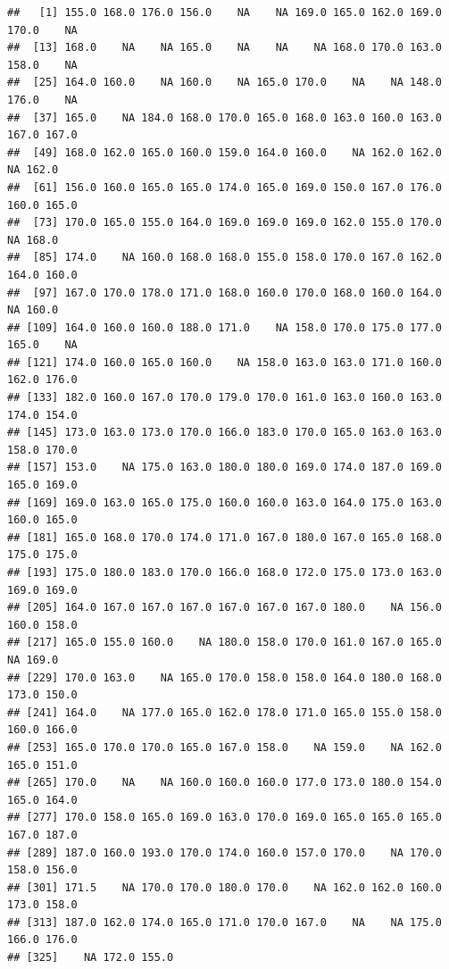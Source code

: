 \documentclass[
]{article}
\newenvironment{Shaded}{\begin{snugshade}}{\end{snugshade}}
\newcommand{\NormalTok}[1]{#1}
\newcommand{\SpecialCharTok}[1]{\textcolor[rgb]{0.00,0.00,0.00}{#1}}
\begin{document}
\begin{verbatim}
##   [1] 155.0 168.0 176.0 156.0    NA    NA 169.0 165.0 162.0 169.0 170.0    NA
##  [13] 168.0    NA    NA 165.0    NA    NA    NA 168.0 170.0 163.0 158.0    NA
##  [25] 164.0 160.0    NA 160.0    NA 165.0 170.0    NA    NA 148.0 176.0    NA
##  [37] 165.0    NA 184.0 168.0 170.0 165.0 168.0 163.0 160.0 163.0 167.0 167.0
##  [49] 168.0 162.0 165.0 160.0 159.0 164.0 160.0    NA 162.0 162.0    NA 162.0
##  [61] 156.0 160.0 165.0 165.0 174.0 165.0 169.0 150.0 167.0 176.0 160.0 165.0
##  [73] 170.0 165.0 155.0 164.0 169.0 169.0 169.0 162.0 155.0 170.0    NA 168.0
##  [85] 174.0    NA 160.0 168.0 168.0 155.0 158.0 170.0 167.0 162.0 164.0 160.0
##  [97] 167.0 170.0 178.0 171.0 168.0 160.0 170.0 168.0 160.0 164.0    NA 160.0
## [109] 164.0 160.0 160.0 188.0 171.0    NA 158.0 170.0 175.0 177.0 165.0    NA
## [121] 174.0 160.0 165.0 160.0    NA 158.0 163.0 163.0 171.0 160.0 162.0 176.0
## [133] 182.0 160.0 167.0 170.0 179.0 170.0 161.0 163.0 160.0 163.0 174.0 154.0
## [145] 173.0 163.0 173.0 170.0 166.0 183.0 170.0 165.0 163.0 163.0 158.0 170.0
## [157] 153.0    NA 175.0 163.0 180.0 180.0 169.0 174.0 187.0 169.0 165.0 169.0
## [169] 169.0 163.0 165.0 175.0 160.0 160.0 163.0 164.0 175.0 163.0 160.0 165.0
## [181] 165.0 168.0 170.0 174.0 171.0 167.0 180.0 167.0 165.0 168.0 175.0 175.0
## [193] 175.0 180.0 183.0 170.0 166.0 168.0 172.0 175.0 173.0 163.0 169.0 169.0
## [205] 164.0 167.0 167.0 167.0 167.0 167.0 167.0 180.0    NA 156.0 160.0 158.0
## [217] 165.0 155.0 160.0    NA 180.0 158.0 170.0 161.0 167.0 165.0    NA 169.0
## [229] 170.0 163.0    NA 165.0 170.0 158.0 158.0 164.0 180.0 168.0 173.0 150.0
## [241] 164.0    NA 177.0 165.0 162.0 178.0 171.0 165.0 155.0 158.0 160.0 166.0
## [253] 165.0 170.0 170.0 165.0 167.0 158.0    NA 159.0    NA 162.0 165.0 151.0
## [265] 170.0    NA    NA 160.0 160.0 160.0 177.0 173.0 180.0 154.0 165.0 164.0
## [277] 170.0 158.0 165.0 169.0 163.0 170.0 169.0 165.0 165.0 165.0 167.0 187.0
## [289] 187.0 160.0 193.0 170.0 174.0 160.0 157.0 170.0    NA 170.0 158.0 156.0
## [301] 171.5    NA 170.0 170.0 180.0 170.0    NA 162.0 162.0 160.0 173.0 158.0
## [313] 187.0 162.0 174.0 165.0 171.0 170.0 167.0    NA    NA 175.0 166.0 176.0
## [325]    NA 172.0 155.0
\end{verbatim}

\begin{Shaded}
\end{Shaded}
\end{document}
